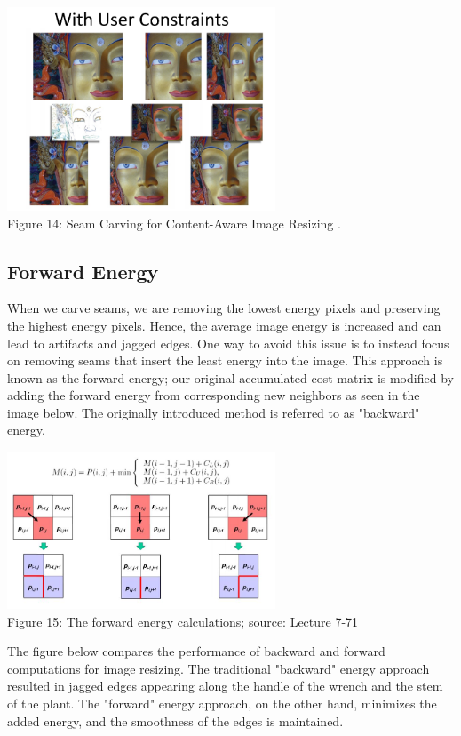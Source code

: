 \documentclass{article}
\begin{document}
\begin{center}
\includegraphics[width=8cm]{user_constraints.PNG} \\
Figure 14: Seam Carving	for	Content-Aware Image	Resizing \cite{avidan2007seam}.
\end{center}
%

\subsection{Forward Energy}
When we carve seams, we are removing the lowest energy pixels and preserving the highest energy pixels. Hence, the average image energy is increased and can lead to artifacts and jagged edges. One way to avoid this issue is to instead focus on removing seams that insert the least energy into the image. This approach is known as the forward energy; our original accumulated cost matrix is modified by adding the forward energy from corresponding new neighbors as seen in the image below. The originally introduced method is referred to as "backward" energy.

\begin{center}
\includegraphics[width=8cm]{forward_energy_calculation.JPG} \\
Figure 15: The forward energy calculations; source: Lecture 7-71
\end{center}

The figure below compares the performance of backward and forward computations for image resizing. The traditional "backward" energy approach resulted in jagged edges appearing along the handle of the wrench and the stem of the plant. The "forward" energy approach, on the other hand, minimizes the added energy, and the smoothness of the edges is maintained.
\end{document}
